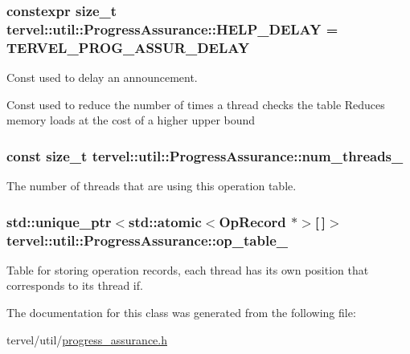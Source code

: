 \subsubsection[{H\+E\+L\+P\+\_\+\+D\+E\+L\+A\+Y}]{\setlength{\rightskip}{0pt plus 5cm}constexpr size\+\_\+t tervel\+::util\+::\+Progress\+Assurance\+::\+H\+E\+L\+P\+\_\+\+D\+E\+L\+A\+Y = {\bf T\+E\+R\+V\+E\+L\+\_\+\+P\+R\+O\+G\+\_\+\+A\+S\+S\+U\+R\+\_\+\+D\+E\+L\+A\+Y}\hspace{0.3cm}{\ttfamily [static]}}\label{classtervel_1_1util_1_1_progress_assurance_a7b1a1448c14b614503aff9312593c9bc}


Const used to delay an announcement. 

Const used to reduce the number of times a thread checks the table Reduces memory loads at the cost of a higher upper bound \hypertarget{classtervel_1_1util_1_1_progress_assurance_a33770716cc5c51b06474d3a108992efb}{}
\subsubsection[{num\+\_\+threads\+\_\+}]{\setlength{\rightskip}{0pt plus 5cm}const size\+\_\+t tervel\+::util\+::\+Progress\+Assurance\+::num\+\_\+threads\+\_\+\hspace{0.3cm}{\ttfamily [private]}}\label{classtervel_1_1util_1_1_progress_assurance_a33770716cc5c51b06474d3a108992efb}


The number of threads that are using this operation table. 

\hypertarget{classtervel_1_1util_1_1_progress_assurance_a7db95582f6fda286d62000d65963a926}{}
\subsubsection[{op\+\_\+table\+\_\+}]{\setlength{\rightskip}{0pt plus 5cm}std\+::unique\+\_\+ptr$<$std\+::atomic$<${\bf Op\+Record} $\ast$$>$\mbox{[}$\,$\mbox{]}$>$ tervel\+::util\+::\+Progress\+Assurance\+::op\+\_\+table\+\_\+\hspace{0.3cm}{\ttfamily [private]}}\label{classtervel_1_1util_1_1_progress_assurance_a7db95582f6fda286d62000d65963a926}


Table for storing operation records, each thread has its own position that corresponds to its thread if. 



The documentation for this class was generated from the following file\+:\begin{DoxyCompactItemize}
\item 
tervel/util/\hyperlink{progress__assurance_8h}{progress\+\_\+assurance.\+h}\end{DoxyCompactItemize}
